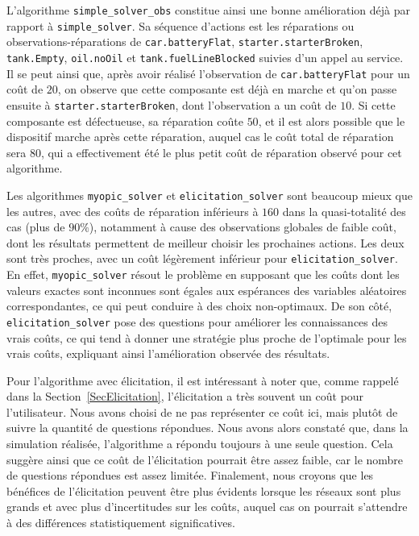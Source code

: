\documentclass[a4paper,11pt]{article}
\theoremstyle{plain}
\theoremstyle{definition}
\begin{document}
L'algorithme \texttt{simple\_solver\_obs} constitue ainsi une bonne amélioration déjà par rapport à \texttt{simple\_solver}. Sa séquence d'actions est les réparations ou observations-réparations de \texttt{car.\allowbreak{}batteryFlat}, \texttt{starter.starterBroken}, \texttt{tank.Empty}, \texttt{oil.noOil} et \texttt{tank.fuelLineBlocked} suivies d'un appel au service. Il se peut ainsi que, après avoir réalisé l'observation de \texttt{car.battery\allowbreak{}Flat} pour un coût de $20$, on observe que cette composante est déjà en marche et qu'on passe ensuite à \texttt{starter.starterBroken}, dont l'observation a un coût de $10$. Si cette composante est défectueuse, sa réparation coûte $50$, et il est alors possible que le dispositif marche après cette réparation, auquel cas le coût total de réparation sera $80$, qui a effectivement été le plus petit coût de réparation observé pour cet algorithme.

Les algorithmes \texttt{myopic\_solver} et \texttt{elicitation\_solver} sont beaucoup mieux que les autres, avec des coûts de réparation inférieurs à $160$ dans la quasi-totalité des cas (plus de $90\%$), notamment à cause des observations globales de faible coût, dont les résultats permettent de meilleur choisir les prochaines actions. Les deux sont très proches, avec un coût légèrement inférieur pour \texttt{elicitation\_solver}. En effet, \texttt{myopic\_solver} résout le problème en supposant que les coûts dont les valeurs exactes sont inconnues sont égales aux espérances des variables aléatoires correspondantes, ce qui peut conduire à des choix non-optimaux. De son côté, \texttt{elicitation\_solver} pose des questions pour améliorer les connaissances des vrais coûts, ce qui tend à donner une stratégie plus proche de l'optimale pour les vrais coûts, expliquant ainsi l'amélioration observée des résultats.

Pour l'algorithme avec élicitation, il est intéressant à noter que, comme rappelé dans la Section~\ref{SecElicitation}, l'élicitation a très souvent un coût pour l'utilisateur. Nous avons choisi de ne pas représenter ce coût ici, mais plutôt de suivre la quantité de questions répondues. Nous avons alors constaté que, dans la simulation réalisée, l'algorithme a répondu toujours à une seule question. Cela suggère ainsi que ce coût de l'élicitation pourrait être assez faible, car le nombre de questions répondues est assez limitée. Finalement, nous croyons que les bénéfices de l'élicitation peuvent être plus évidents lorsque les réseaux sont plus grands et avec plus d'incertitudes sur les coûts, auquel cas on pourrait s'attendre à des différences statistiquement significatives.
\end{document}
